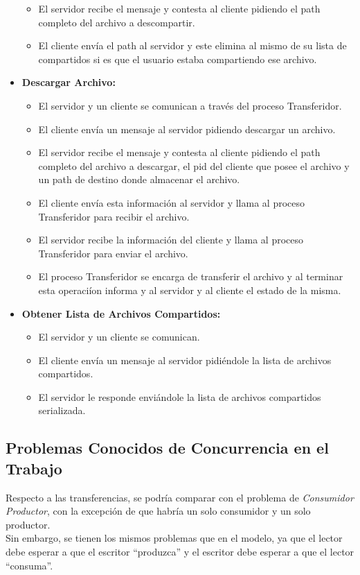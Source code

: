 \documentclass[a4paper,10pt]{article}
\begin{document}
\begin{itemize}
\begin{itemize}
						\item El servidor recibe el mensaje y contesta al cliente pidiendo el path completo del
								archivo a descompartir.
						\item El cliente env\'ia el path al servidor y este elimina al mismo de su lista de compartidos
								si es que el usuario estaba compartiendo ese archivo.
					\end{itemize}
				\item \textbf{Descargar Archivo:}
					\begin{itemize}
						\item El servidor y un cliente se comunican a trav\'es del proceso Transferidor.
						\item El cliente env\'ia un mensaje al servidor pidiendo descargar un archivo.
						\item El servidor recibe el mensaje y contesta al cliente pidiendo el path completo del 
									archivo a descargar, el pid del cliente que posee el archivo y un path de destino
									donde almacenar el archivo.
						\item El cliente env\'ia esta informaci\'on al servidor y llama al proceso Transferidor para
									recibir el archivo.
						\item El servidor recibe la informaci\'on del cliente y llama al proceso Transferidor para
									enviar el archivo.
						\item El proceso Transferidor se encarga de transferir el archivo y al terminar esta operaci\'ion 
									informa y al servidor y al cliente el estado de la misma.
					\end{itemize}
				
				\item \textbf{Obtener Lista de Archivos Compartidos:}
					\begin{itemize}
						\item El servidor y un cliente se comunican.
						\item El cliente env\'ia un mensaje al servidor pidi\'endole la lista de archivos compartidos.
						\item El servidor le responde envi\'andole la lista de archivos compartidos serializada.
					\end{itemize}
			\end{itemize}

	\subsection{Problemas Conocidos de Concurrencia en el Trabajo}
	Respecto a las transferencias, se podr\'ia comparar con el 
	problema de \emph{Consumidor Productor}, con la excepci\'on de que habr\'ia un solo consumidor y un solo productor. \\
	Sin embargo, se tienen los mismos problemas que en el modelo, ya que el lector debe esperar a que el escritor
	 ``produzca'' 
	y el escritor debe esperar a que el lector ``consuma''.
	
\end{document}
